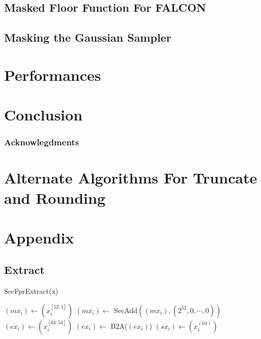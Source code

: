 \documentclass[runningheads]{llncs}
\begin{document}
\subsection{Masked Floor Function For FALCON}
\subsection{Masking the Gaussian Sampler}
\section{Performances}\label{sec:perf}



\section{Conclusion}\label{sec:conclusion}
\subsubsection{Acknowlegdments}

%
%
%

\newpage


 
 

 \appendix
\section{Alternate Algorithms For Truncate and Rounding}\label{app:function}

\section*{Appendix}
\subsection*{Extract}

\begin{algorithm}[H]
  \caption{SecFprExtract(x)}
  \label{algo:SecFprExtract }
  $(mx_i) \leftarrow (x_i^{[52:1]})$\;
  $(mx_i) \leftarrow$ SecAdd$((mx_i), (2^{52}, 0, \cdots, 0))$ 
  $(ex_i) \leftarrow (x_i^{[63:53]})$\;
  $(ex_i) \leftarrow$ B2A($(ex_i)$)\;
  $(sx_i) \leftarrow (x_i^{(64)})$\;
\;
\end{algorithm}
\end{document}
